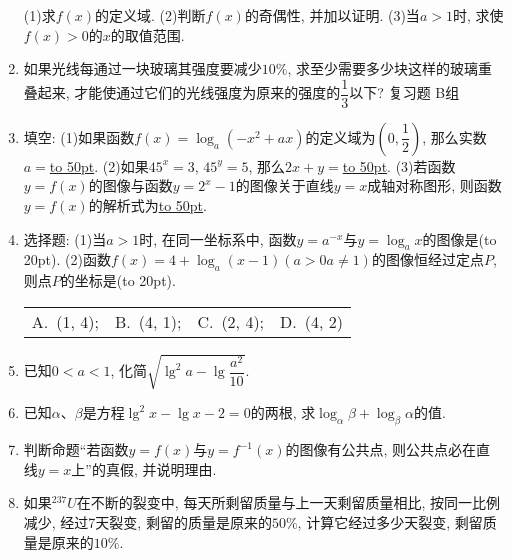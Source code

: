 \documentclass[10pt,a4paper]{article}
\newcommand{\blank}[1]{\underline{\hbox to #1pt{}}}
\newcommand{\bracket}[1]{(\hbox to #1pt{})}
\newcommand{\fourch}[4]{\par\begin{tabular}{p{.23\textwidth}p{.23\textwidth}p{.23\textwidth}p{.23\textwidth}}
A.~#1 &B.~#2& C.~#3& D.~#4
\end{tabular}}
\begin{document}
\begin{enumerate}[1.]
(1)求$f(x)$的定义域.
(2)判断$f(x)$的奇偶性, 并加以证明.
(3)当$a>1$时, 求使$f(x)>0$的$x$的取值范围.
\item 如果光线每通过一块玻璃其强度要减少$10\%$, 求至少需要多少块这样的玻璃重叠起来, 才能使通过它们的光线强度为原来的强度的$\dfrac 13$以下?
复习题
B组
\item 填空:
(1)如果函数$f(x)=\log _a(-x^2+ax)$的定义域为$(0,\dfrac 12)$, 那么实数$a=$\blank{50}.
(2)如果$45^x=3$, $45^y=5$, 那么$2x+y=$\blank{50}.
(3)若函数$y=f(x)$的图像与函数$y=2^x-1$的图像关于直线$y=x$成轴对称图形, 则函数$y=f(x)$的解析式为\blank{50}.
\item 选择题:
(1)当$a>1$时, 在同一坐标系中, 函数$y=a^{-x}$与$y=\log _ax$的图像是\bracket{20}.
(2)函数$f(x)=4+\log _a(x-1)(a>0a\ne 1)$的图像恒经过定点$P$, 则点$P$的坐标是\bracket{20}.
\fourch{(1, 4);}{(4, 1);}{(2, 4);}{(4, 2)}
\item 已知$0<a<1$, 化简$\sqrt {\lg ^2a-\lg \dfrac{a^2}{10}}$.
\item 已知$\alpha$、$\beta$是方程$\lg ^2x-\lg x-2=0$的两根, 求$\log _{\alpha }\beta +\log _{\beta }\alpha$的值.
\item 判断命题``若函数$y=f(x)$与$y=f^{-1}(x)$的图像有公共点, 则公共点必在直线$y=x$上''的真假, 并说明理由.
\item 如果$^{237}U$在不断的裂变中, 每天所剩留质量与上一天剩留质量相比, 按同一比例减少, 经过7天裂变, 剩留的质量是原来的$50\%$, 计算它经过多少天裂变, 剩留质量是原来的$10\%$.


\end{enumerate}
\end{document}
